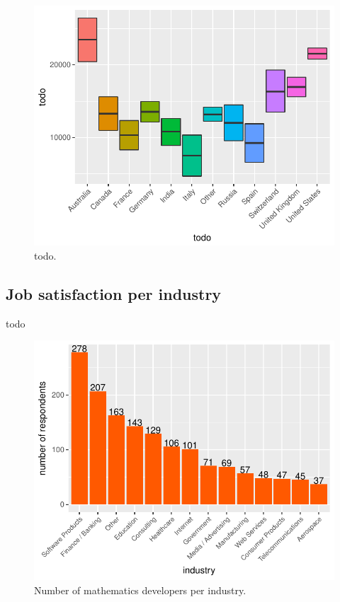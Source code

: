 \documentclass{article}
\begin{document}
\begin{figure}[H]
\centering
\includegraphics{report-029}
\caption{todo.}\label{fig_8}
\end{figure}

\subsection{Job satisfaction per industry}
todo


\begin{figure}[H]
\centering
\includegraphics{report-031}
\caption{Number of mathematics developers per industry.}\label{fig_9}
\end{figure}
\end{document}
